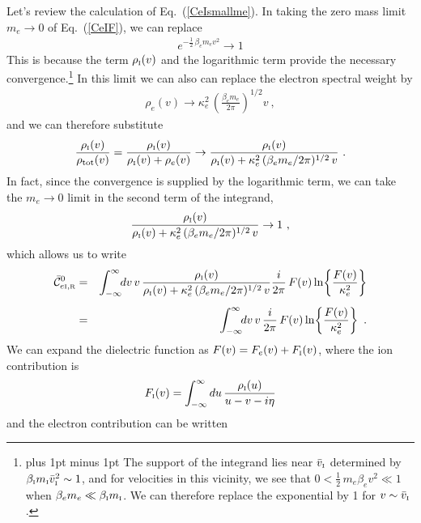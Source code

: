\documentclass[preprint,12pt,eqsecnum,nofootinbib,amsmath,amssymb]{revtex4}
\newcommand{\smI}{{\rm\scriptscriptstyle I}}
\newcommand{\smR}{{\rm\scriptscriptstyle R}}
\newcommand{\footnoteskip}{\baselineskip 12pt plus 1pt minus 1pt}
\begin{document}
{{{{{{{Let's review the calculation of Eq.~(\ref{CeIsmallme}).  In taking the
zero mass limit $m_e \to 0$ of Eq.~(\ref{CeIF}), we can replace
\begin{eqnarray}
  e^{-\frac{1}{2}\,\beta_e m_e v^2} \to 1 
\end{eqnarray}
This is because the term $\rho_\smI(v)$ and the
logarithmic term provide the necessary convergence.\footnote{
\footnoteskip
  The support of the integrand lies near $\bar v_\smI$ determined by
  $\beta_\smI m_\smI \bar v_\smI^2 \sim 1$, and for velocities in this
  vicinity, we see that \hbox{$0 < \frac{1}{2}\, m_e \beta_e v^2 \ll
    1$} when $\beta_e m_e \ll \beta_\smI m_\smI$.  We can therefore
  replace the exponential by 1 for $v \sim \bar v_\smI$.
} In this limit we can also can replace the electron spectral weight
by
\begin{eqnarray}
  \rho_e(v) \to \kappa_e^2 \,\left(\frac{\beta_e m_e}{2\pi}\right)^{1/2} v \ ,
\end{eqnarray}
and we can therefore substitute
\begin{eqnarray}
  \frac{\rho_\smI(v)}{\rho_\text{tot}(v)}
  =
  \frac{\rho_\smI(v)}{\rho_\smI(v) + \rho_e(v)}
  \to
  \frac{\rho_\smI(v)}{\rho_\smI(v) + \kappa_e^2\, 
  (\beta_e m_e/2\pi)^{1/2}\,v }   \   .
\end{eqnarray}
In fact, since the convergence is supplied by the logarithmic term, we
can take the $m_e \to 0$ limit in the second term of the integrand,
\begin{eqnarray}
  \frac{\rho_\smI(v)}{\rho_\smI(v) + \kappa_e^2\, 
  (\beta_e m_e/2\pi)^{1/2}\,v } \to 1 \ ,
\end{eqnarray}
which allows us to write
\begin{eqnarray}
  \bar{\cal C}^0_{e\smI,\smR} 
  &=&
  \int_{-\infty}^{\infty} \!\! dv \, v\, 
  \frac{\rho_\smI(v)}{\rho_\smI(v) + \kappa_e^2\, 
  (\beta_e m_e/2\pi)^{1/2}\,v }
  \frac{i}{2 \pi} \,F(v) 
  \ln\! \left\{\frac{F(v)}{\kappa_e^2}\right\} 
\\[5pt]
  &=&
  \int_{-\infty}^{\infty} \!\! dv \, v\, 
  \frac{i}{2 \pi} \,F(v) 
  \ln\! \left\{\frac{F(v)}{\kappa_e^2}\right\} \ .
\label{CzeroONE}  
\end{eqnarray}
We can expand the dielectric function as $F(v)= F_e(v) + F_\smI(v)$,
where the ion contribution is
\begin{eqnarray}
  F_\smI(v) 
  =
  \int_{-\infty}^\infty du\, \frac{\rho_\smI(u)}{u -v - i \eta}
\end{eqnarray}
and the electron contribution can be written
}}}}}}}
\end{document}
